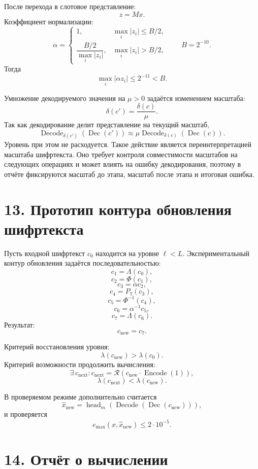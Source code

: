 \documentclass[12pt]{article}
\newcommand{\Dec}{\operatorname{Dec}}
\newcommand{\Encode}{\operatorname{Encode}}
\newcommand{\Decode}{\operatorname{Decode}}
\newcommand{\Resc}{\mathcal{R}}
\newcommand{\Lift}{\Lambda}
\newcommand{\CtoS}{\Phi}
\newcommand{\StoC}{\Phi^{-1}}
\newcommand{\lvl}{\lambda}
\newcommand{\scl}{\delta}
\newcommand{\head}{\operatorname{head}}
\begin{document}
После перехода в слотовое представление:
\[
    z=Mx.
\]
Коэффициент нормализации:
\[
    \alpha=
    \begin{cases}
        1,&\max_i|z_i|\leq B/2,\\[4pt]
        \dfrac{B/2}{\max_i|z_i|},&\max_i|z_i|>B/2,
    \end{cases}
    \qquad
    B=2^{-10}.
\]
Тогда
\[
    \max_i|\alpha z_i|\leq 2^{-11}<B.
\]

Умножение декодируемого значения на \(\mu>0\) задаётся изменением масштаба:
\[
    \scl(c')=\frac{\scl(c)}{\mu}.
\]
Так как декодирование делит представление на текущий масштаб,
\[
    \Decode_{\scl(c')}\left(\Dec(c')\right)
    \approx
    \mu
    \Decode_{\scl(c)}\left(\Dec(c)\right).
\]
Уровень при этом не расходуется.
Такое действие является переинтерпретацией масштаба шифртекста. Оно требует
контроля совместимости масштабов на следующих операциях и может влиять на
ошибку декодирования, поэтому в отчёте фиксируются масштаб до этапа, масштаб
после этапа и итоговая ошибка.

\section*{13. Прототип контура обновления шифртекста}

Пусть входной шифртекст \(c_0\) находится на уровне \(\ell<L\).
Экспериментальный контур обновления задаётся последовательностью:
\[
    c_1=\Lift(c_0),
\]
\[
    c_2=\CtoS(c_1),
\]
\[
    c_3=\alpha c_2,
\]
\[
    c_4=P_7(c_3),
\]
\[
    c_5=\StoC(c_4),
\]
\[
    c_6=\alpha^{-1}c_5,
\]
\[
    c_7=\Lift(c_6).
\]
Результат:
\[
    c_{\operatorname{new}}=c_7.
\]

Критерий восстановления уровня:
\[
    \lvl(c_{\operatorname{new}})>\lvl(c_0).
\]
Критерий возможности продолжить вычисления:
\[
    \exists\,c_{\operatorname{next}}:
    c_{\operatorname{next}}
    =
    \Resc(c_{\operatorname{new}}\cdot\Encode(1)),
\]
\[
    \lvl(c_{\operatorname{next}})<\lvl(c_{\operatorname{new}}).
\]

В проверяемом режиме дополнительно считается
\[
    \hat{x}_{\operatorname{new}}
    =
    \head_m
    \left(
        \Decode
        \left(
            \Dec(c_{\operatorname{new}})
        \right)
    \right),
\]
и проверяется
\[
    e_{\max}(x,\hat{x}_{\operatorname{new}})
    \leq
    2\cdot 10^{-5}.
\]

\section*{14. Отчёт о вычислении}
\end{document}
